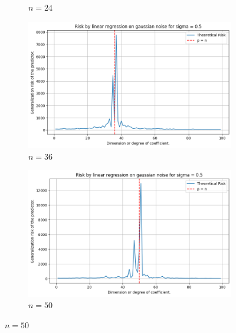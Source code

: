 \documentclass[twoside,10pt]{article}
\begin{document}
\begin{figure}[htb]
\begin{subfigure}[b]{\imgwidth}
    \caption{$n=24$}\label{fig:1b2}
  \end{subfigure}%
  \hfill
  \begin{subfigure}[b]{\imgwidth}
    \includegraphics[width=\linewidth]{img/descent_devel3.png}
    \caption{$n=36$}\label{fig:1c2}
  \end{subfigure}%
  \hfill
  \begin{subfigure}[b]{\imgwidth}
    \includegraphics[width=\linewidth]{img/descent_devel4.png}
    \caption{$n=50$}\label{fig:1d2}
  \end{subfigure}

  \medskip


\end{figure}
\end{document}
